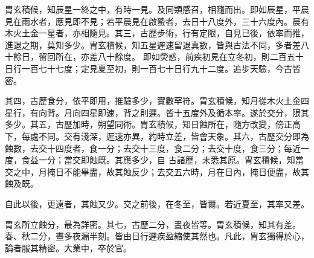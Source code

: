 \begin{pinyinscope}
 胄玄積候，知辰星一終之中，有時一見。及同類感召，相隨而出。即如辰星，平晨見在雨水者，應見即不見；若平晨見在啟蟄者，去日十八度外，三十六度內。晨有木火土金一星者，亦相隨見。其三，古歷步術，行有定限，自見已後，依率而推，進退之期，莫知多少。胄玄積候，知五星遲速留退真數，皆與古法不同，多者差八十餘日，留回所在，亦差八十餘度。
 即如熒惑，前疾初見在立冬初，則二百五十日行一百七十七度；定見夏至初，則一百七十日行九十二度。追步天驗，今古皆密。



 其四，古歷食分，依平即用，推驗多少，實數罕符。胄玄積候，知月從木火土金四星行，有向背。月向四星即速，背之則遲。皆十五度外及循本率。遂於交分，限其多少。其五，古歷加時，朔望同術。胄玄積候，知日蝕所在，隨方改變，傍正高下，每處不同。交有淺深，遲速亦異，約時立差，皆會天象。其六，古歷交分即為蝕數，去交十四度者，食一分；去交十三度，食二分；去交十度，食三分；每近一度，食益一分；當交即蝕既。其應多少，自
 古諸歷，未悉其原。胄玄積候，知當交之中，月掩日不能畢盡，故其蝕反少；去交五六時，月在日內，掩日便盡，故其蝕及既。



 自此以後，更遠者，其蝕又少。交之前後，在冬至，皆爾。若近夏至，其率又差。



 胄玄所立蝕分，最為詳密。其七，古歷二分，晝夜皆等。胄玄積候，知其有差。春、秋二分，晝多夜漏半刻。皆由日行遲疾盈縮使其然也。凡此，胄玄獨得於心，論者服其精密。大業中，卒於官。



\end{pinyinscope}